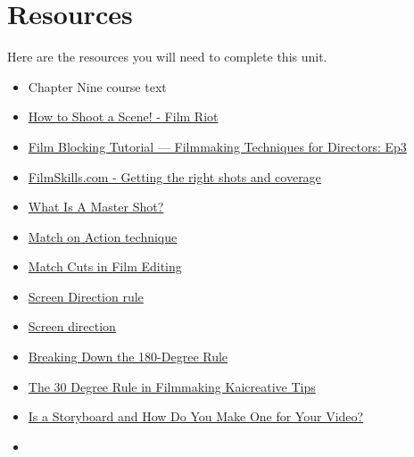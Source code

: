 \documentclass[
]{book}
\providecommand{\tightlist}{%
  \setlength{\itemsep}{0pt}\setlength{\parskip}{0pt}}
\begin{document}
\hypertarget{resources-8}{%
\section*{Resources}\label{resources-8}}

Here are the resources you will need to complete this unit.

\begin{itemize}
\tightlist
\item
  Chapter Nine course text\\
\item
  \href{https://www.youtube.com/watch?v=IK2IAEO-FUI}{How to Shoot a Scene! - Film Riot}\\
\item
  \href{https://www.youtube.com/watch?v=9AGaECt9j4g}{Film Blocking Tutorial --- Filmmaking Techniques for Directors: Ep3}\\
\item
  \href{https://www.youtube.com/watch?v=okphB85lfjk}{FilmSkills.com - Getting the right shots and coverage}\\
\item
  \href{https://www.youtube.com/watch?v=cz3nBkIa9K0}{What Is A Master Shot?}\\
\item
  \href{https://www.youtube.com/watch?v=eou7A-e2e4I}{Match on Action technique}\\
\item
  \href{https://www.youtube.com/watch?v=El28XrjtcMI}{Match Cuts in Film Editing}\\
\item
  \href{https://www.youtube.com/watch?v=9XOn5uxdSJc}{Screen Direction rule}\\
\item
  \href{https://www.youtube.com/watch?v=RogoUz_pk4Y}{Screen direction}\\
\item
  \href{https://www.youtube.com/watch?v=HinUychY3sE}{Breaking Down the 180-Degree Rule}\\
\item
  \href{https://www.youtube.com/watch?v=1K8EUc98VoQ}{The 30 Degree Rule in Filmmaking \textbar{} Kaicreative \textbar{} Tips}\\
\item
  \href{https://www.wyzowl.com/what-is-a-storyboard/What}{Is a Storyboard and How Do You Make One for Your Video?}\\
\item

\end{itemize}
\end{document}
